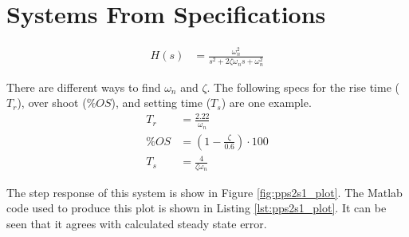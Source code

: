 \documentclass{article}
\newcommand{\sincludepdf}[2][]{
	
}
\begin{document}

\sincludepdf[pages={1},
		pagecommand=\section{Laplace Transform}\subsection*{Example 1}
	]{scan/11211301.pdf}

\section{Systems From Specifications}

\begin{align}
	H(s) &= \frac{\omega_n^2}{s^2 + 2 \zeta \omega_n s + \omega_n^2}
\end{align}

There are different ways to find $\omega_n$ and $\zeta$.
The following specs for the rise time ($T_r$), over shoot ($\%OS$),
and setting time ($T_s$) are one example.
\begin{align*}
	T_r &= \frac{2.22}{\omega_n} \\
	\%OS &= \left( 1 - \frac{\zeta}{0.6} \right) \cdot 100 \\
	T_s &= \frac{4}{\zeta \omega_n}
\end{align*}

\sincludepdf[pages={3},
			pagecommand=\subsection*{Example 1}
		]{scan/11221301.pdf}

\sincludepdf[pages={2},
	pagecommand=\section{Pole Placement, Polynomial Matching}\label{sec:pp}\subsection*{Example 1}
	]{scan/11231301.pdf}
\sincludepdf[pages={3}]{scan/11231301.pdf}

\sincludepdf[pages={5}]{scan/11241301.pdf}

The step response of this system is show in Figure \ref{fig:pps2s1_plot}.
The Matlab code used to produce this plot is shown
in Listing \ref{lst:pps2s1_plot}.
It can be seen that it agrees with calculated steady state error.
\end{document}

